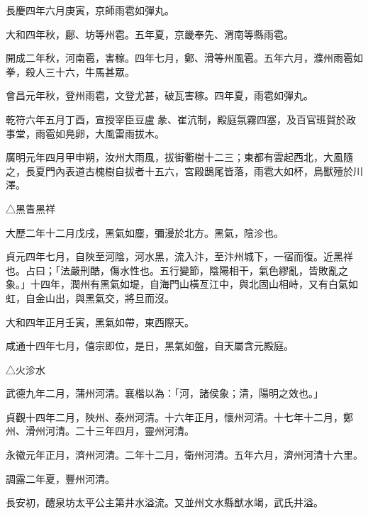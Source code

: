 \begin{pinyinscope}
 長慶四年六月庚寅，京師雨雹如彈丸。



 大和四年秋，鄜、坊等州雹。五年夏，京畿奉先、渭南等縣雨雹。



 開成二年秋，河南雹，害稼。四年七月，鄭、滑等州風雹。五年六月，濮州雨雹如拳，殺人三十六，牛馬甚眾。



 會昌元年秋，登州雨雹，文登尤甚，破瓦害稼。四年夏，雨雹如彈丸。



 乾符六年五月丁酉，宣授宰臣豆盧彖、崔沆制，殿庭氛霧四塞，及百官班賀於政事堂，雨雹如鳧卵，大風雷雨拔木。



 廣明元年四月甲申朔，汝州大雨風，拔街衢樹十二三；東都有雲起西北，大風隨之，長夏門內表道古槐樹自拔者十五六，宮殿鴟尾皆落，雨雹大如杯，鳥獸殪於川澤。



 △黑眚黑祥



 大歷二年十二月戊戌，黑氣如塵，彌漫於北方。黑氣，陰沴也。



 貞元四年七月，自陜至河陰，河水黑，流入汴，至汴州城下，一宿而復。近黑祥也。占曰；「法嚴刑酷，傷水性也。五行變節，陰陽相干，氣色繆亂，皆敗亂之象。」十四年，潤州有黑氣如堤，自海門山橫亙江中，與北固山相峙，又有白氣如虹，自金山出，與黑氣交，將旦而沒。



 大和四年正月壬寅，黑氣如帶，東西際天。



 咸通十四年七月，僖宗即位，是日，黑氣如盤，自天屬含元殿庭。



 △火沴水



 武德九年二月，蒲州河清。襄楷以為：「河，諸侯象；清，陽明之效也。」



 貞觀十四年二月，陜州、泰州河清。十六年正月，懷州河清。十七年十二月，鄭州、滑州河清。二十三年四月，靈州河清。



 永徽元年正月，濟州河清。二年十二月，衛州河清。五年六月，濟州河清十六里。



 調露二年夏，豐州河清。



 長安初，醴泉坊太平公主第井水溢流。又並州文水縣猷水竭，武氏井溢。




\end{pinyinscope}
